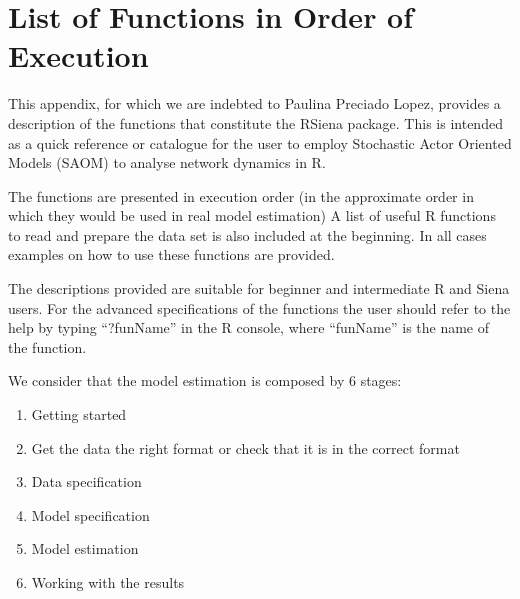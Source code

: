 \documentclass[a4paper,fleqn]{article}
\newcommand{\+}{\, + \,}
\begin{document}
{%

\appendix
\newpage
\section{List of Functions in Order of Execution}

    This appendix, for which we are indebted to Paulina Preciado Lopez,
    provides a description of the functions that constitute the
    RSiena package. This is intended as a quick reference or catalogue for the
    user to employ Stochastic Actor Oriented Models (SAOM) to analyse network
    dynamics in R.

    The functions are presented in execution order (in the approximate order in
    which they would be used in real model estimation) A list of useful R
    functions to read and prepare the data set is also included at the
    beginning. In all cases examples on how to use these functions are provided.

    The descriptions provided are suitable for beginner and intermediate R and
    Siena users. For the advanced specifications of the functions the user
    should refer to the help by typing ``?funName'' in the R console, where
    ``funName'' is the name of the function.

    We consider that the model estimation is composed by 6 stages:
\begin{enumerate}
    \item Getting started
    \item Get the data the right format or check that it is in the correct
      format
    \item Data specification
    \item Model specification
    \item   Model estimation
    \item   Working with the results
\end{enumerate}

}
\end{document}

